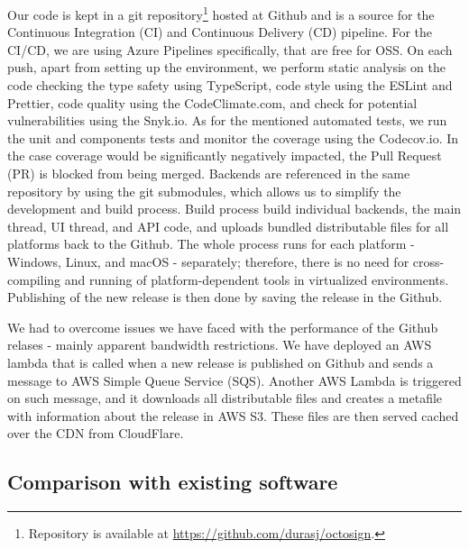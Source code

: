 \documentclass[thesismargins, english, thesislinespacing, onelinechapterstyle, upjsfrontpage]{rnthesis}
\begin{document}
Our code is kept in a git repository\footnote{Repository is available at \url{https://github.com/durasj/octosign}.} hosted at Github and is a source for the Continuous Integration (CI) and Continuous Delivery (CD) pipeline.
For the CI/CD, we are using Azure Pipelines specifically, that are free for OSS.
On each push, apart from setting up the environment, we perform static analysis on the code checking the type safety using TypeScript, code style using the ESLint and Prettier, code quality using the CodeClimate.com, and check for potential vulnerabilities using the Snyk.io.
As for the mentioned automated tests, we run the unit and components tests and monitor the coverage using the Codecov.io.
In the case coverage would be significantly negatively impacted, the Pull Request (PR) is blocked from being merged.
Backends are referenced in the same repository by using the git submodules, which allows us to simplify the development and build process.
Build process build individual backends, the main thread, UI thread, and API code, and uploads bundled distributable files for all platforms back to the Github.
The whole process runs for each platform - Windows, Linux, and macOS - separately; therefore, there is no need for cross-compiling and running of platform-dependent tools in virtualized environments.
Publishing of the new release is then done by saving the release in the Github.

We had to overcome issues we have faced with the performance of the Github relases - mainly apparent bandwidth restrictions.
We have deployed an AWS lambda that is called when a new release is published on Github and sends a message to AWS Simple Queue Service (SQS).
Another AWS Lambda is triggered on such message, and it downloads all distributable files and creates a metafile with information about the release in AWS S3.
These files are then served cached over the CDN from CloudFlare.

\subsection{Comparison with existing software}
\end{document}
